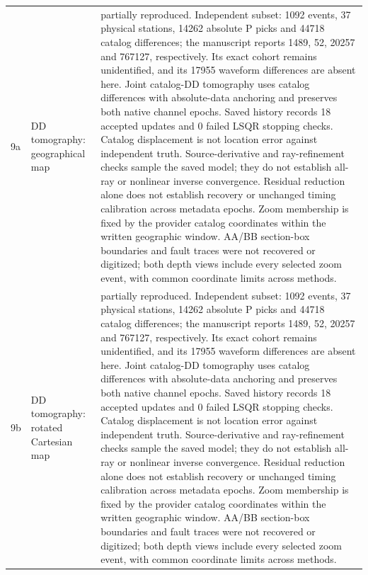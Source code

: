 \begin{longtable}{>{\raggedright\arraybackslash}p{}>{\raggedright\arraybackslash}p{}>{\raggedright\arraybackslash}p{}}
9a & DD tomography: geographical map & partially reproduced. Independent subset: 1092 events, 37 physical stations, 14262 absolute P picks and 44718 catalog differences; the manuscript reports 1489, 52, 20257 and 767127, respectively. Its exact cohort remains unidentified, and its 17955 waveform differences are absent here. Joint catalog-DD tomography uses catalog differences with absolute-data anchoring and preserves both native channel epochs. Saved history records 18 accepted updates and 0 failed LSQR stopping checks. Catalog displacement is not location error against independent truth. Source-derivative and ray-refinement checks sample the saved model; they do not establish all-ray or nonlinear inverse convergence. Residual reduction alone does not establish recovery or unchanged timing calibration across metadata epochs. Zoom membership is fixed by the provider catalog coordinates within the written geographic window. AA/BB section-box boundaries and fault traces were not recovered or digitized; both depth views include every selected zoom event, with common coordinate limits across methods.\\
9b & DD tomography: rotated Cartesian map & partially reproduced. Independent subset: 1092 events, 37 physical stations, 14262 absolute P picks and 44718 catalog differences; the manuscript reports 1489, 52, 20257 and 767127, respectively. Its exact cohort remains unidentified, and its 17955 waveform differences are absent here. Joint catalog-DD tomography uses catalog differences with absolute-data anchoring and preserves both native channel epochs. Saved history records 18 accepted updates and 0 failed LSQR stopping checks. Catalog displacement is not location error against independent truth. Source-derivative and ray-refinement checks sample the saved model; they do not establish all-ray or nonlinear inverse convergence. Residual reduction alone does not establish recovery or unchanged timing calibration across metadata epochs. Zoom membership is fixed by the provider catalog coordinates within the written geographic window. AA/BB section-box boundaries and fault traces were not recovered or digitized; both depth views include every selected zoom event, with common coordinate limits across methods.\\

\end{longtable}
